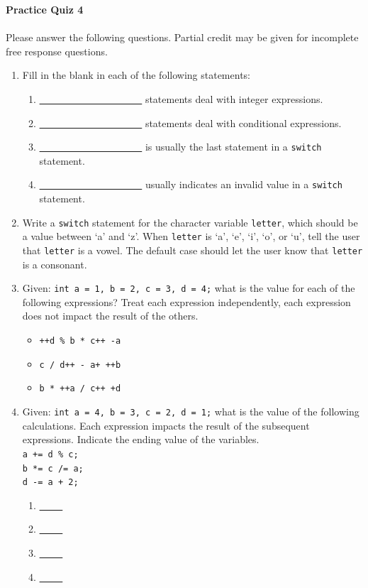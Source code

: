 \documentclass[letter,11pt]{article}
\begin{document}
\huge
\textbf{Practice Quiz 4}
\normalsize

\paragraph{}Please answer the following questions. Partial credit may be given for incomplete free response questions.

\begin{enumerate}
    \item Fill in the blank in each of the following statements:
    \begin{enumerate}
        \item \underline{~~ ~~ ~~ ~~ ~~ ~~ ~~ ~~} statements deal with integer expressions.
        \item \underline{~~ ~~ ~~ ~~ ~~ ~~ ~~ ~~} statements deal with conditional expressions.
        \item \underline{~~ ~~ ~~ ~~ ~~ ~~ ~~ ~~} is usually the last statement in a \texttt{switch} statement.
        \item \underline{~~ ~~ ~~ ~~ ~~ ~~ ~~ ~~} usually indicates an invalid value in a \texttt{switch} statement.
    \end{enumerate}
    
    \item Write a \texttt{switch} statement for the character variable \texttt{letter}, which should be a value between `a' and `z'. When \texttt{letter} is `a', `e', `i', `o', or `u', tell the user that \texttt{letter} is a vowel. The default case should let the user know that \texttt{letter} is a consonant.
    
    \item Given: \texttt{int a = 1, b = 2, c = 3, d = 4;} what is the value for each of the following expressions? Treat each expression independently, each expression does not impact the result of the others.
    \begin{itemize}
        \item \texttt{++d \% b * c++ -a}
        \item \texttt{c / d++ - a+ ++b}
        \item \texttt{b * ++a / c++ +d}
    \end{itemize}
    
    \item Given: \texttt{int a = 4, b = 3, c = 2, d = 1;} what is the value of the following calculations. Each expression impacts the result of the subsequent expressions. Indicate the ending value of the variables. \\
    \texttt{a += d \% c;} \\
    \texttt{b *= c /= a;} \\
    \texttt{d -= a + 2;}
    \begin{enumerate}
        \item \underline{~~ ~~}
        \item \underline{~~ ~~}
        \item \underline{~~ ~~}
        \item \underline{~~ ~~}
    \end{enumerate}
    

\end{enumerate}
\end{document}
